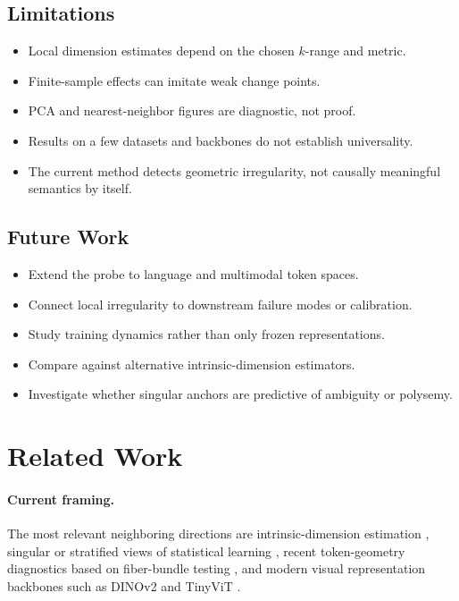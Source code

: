 \documentclass{article}
\theoremstyle{definition}
\theoremstyle{plain}
\theoremstyle{remark}
\begin{document}
\subsection{Limitations}
\label{sec:limitations}
\begin{itemize}[leftmargin=1.5em]
\item Local dimension estimates depend on the chosen $k$-range and metric.
\item Finite-sample effects can imitate weak change points.
\item PCA and nearest-neighbor figures are diagnostic, not proof.
\item Results on a few datasets and backbones do not establish universality.
\item The current method detects geometric irregularity, not causally meaningful semantics by itself.
\end{itemize}

\subsection{Future Work}
\begin{itemize}[leftmargin=1.5em]
\item Extend the probe to language and multimodal token spaces.
\item Connect local irregularity to downstream failure modes or calibration.
\item Study training dynamics rather than only frozen representations.
\item Compare against alternative intrinsic-dimension estimators.
\item Investigate whether singular anchors are predictive of ambiguity or polysemy.
\end{itemize}

\section{Related Work}
\label{sec:related-work}
\paragraph{Current framing.}
The most relevant neighboring directions are intrinsic-dimension estimation \citep{facco2017estimating}, singular or stratified views of statistical learning \citep{watanabe2009algebraic}, recent token-geometry diagnostics based on fiber-bundle testing \citep{robinson2025token,robinson2025stratifiedrepo}, and modern visual representation backbones such as DINOv2 and TinyViT \citep{oquab2023dinov2,wu2022tinyvit}.
\end{document}
